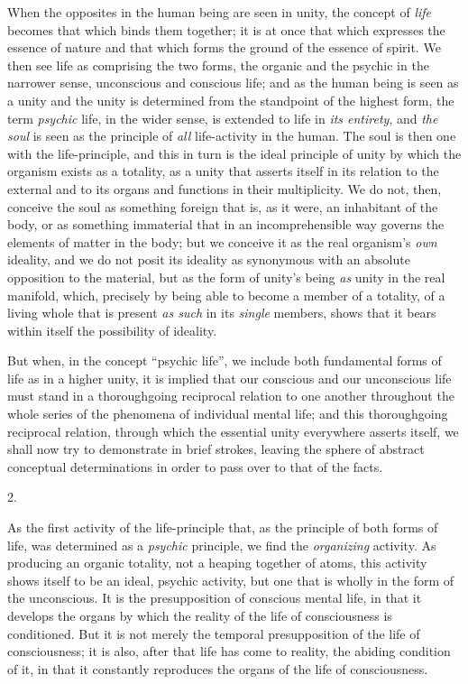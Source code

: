 \documentclass[12pt,a4paper,openany]{book}
\newcommand{\secnum}[1]{\par\begin{center}#1\end{center}\par\nobreak}
\newcommand{\opage}[1]{\marginnote{\footnotesize\textit{[#1]}}}
\begin{document}
When the opposites in the human being are seen in unity, the concept
of \emph{life} becomes that which binds them together; it is at once
that which expresses the essence of nature and that which forms the
ground of the essence of spirit. We then see life as comprising the
two forms, the organic and the psychic in the narrower sense, unconscious
and conscious life; and as the human being is seen as a unity and the
unity is determined from the standpoint of the highest form, the
term \emph{psychic} life, in the wider sense, is extended to life
in \emph{its entirety}, and \emph{the soul} is seen as the principle of
\emph{all} life-activity in the human. The soul is then one with the
\opage{46}life-principle, and this in turn is the ideal principle of unity by
which the organism exists as a totality, as a unity that asserts itself
in its relation to the external and to its organs and functions in
their multiplicity. We do not, then, conceive the soul as something
foreign that is, as it were, an inhabitant of the body, or as something
immaterial that in an incomprehensible way governs the elements of
matter in the body; but we conceive it as the real organism's
\emph{own} ideality, and we do not posit its ideality as synonymous with
an absolute opposition to the material, but as the form of unity's
being \emph{as} unity in the real manifold, which, precisely by being
able to become a member of a totality, of a living whole that is
present \emph{as such} in its \emph{single} members, shows that it
bears within itself the possibility of ideality.

But when, in the concept ``psychic life'', we include both fundamental
forms of life as in a higher unity, it is implied that our conscious
and our unconscious life must stand in a thoroughgoing reciprocal
relation to one another throughout the whole series of the phenomena
of individual mental life; and this thoroughgoing reciprocal relation,
through which the essential unity everywhere asserts itself, we shall
now try to demonstrate in brief strokes, leaving the sphere of abstract
conceptual determinations in order to pass over to that of the facts.

\secnum{2.}

As the first activity of the life-principle that, as the principle of
both forms of life, was determined as a \emph{psychic} principle, we find
the \emph{organizing} activity. As producing an organic totality, not a
heaping together of atoms, this activity shows itself to be an ideal,
psychic activity, but one that is wholly in the form of the unconscious.
It is the presupposition of conscious mental life, in that it develops
the organs by which the reality of the life of consciousness is
conditioned. But it is not merely the temporal presupposition of the
life of consciousness; it is also, after that life has come to reality,
the abiding condition
\opage{47}of it, in that it constantly reproduces the organs of the life of
consciousness.
\end{document}
